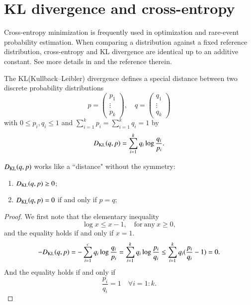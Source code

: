 \section{KL divergence and cross-entropy}
Cross-entropy minimization is frequently used in optimization and rare-event probability estimation. When comparing a distribution    against a fixed reference distribution, cross-entropy and KL divergence are identical up to an additive constant. See more details in \cite{murphy2012machine,kullback1951information,kullback1997information} and the reference therein.

The KL(Kullback--Leibler) divergence defines a special distance between two discrete probability distributions 
$$
p=\left( \begin{array}{ccc}
p_1\\
\vdots \\
p_k
\end{array} \right),\quad  q=\left( \begin{array}{ccc}
q_1\\
\vdots \\
q_k
\end{array} \right)
$$
with $0\le p_i, q_i\le1$ and $\sum_{i=1}^{k}p_i=\sum_{i=1}^{k}q_i=1$ by
\begin{equation}
\label{KL-divergence}
D_{\rm KL}(q,p)= \sum_{i=1}^k q_i\log \frac{q_i}{p_i}.  
\end{equation}

\begin{lemma}\mbox{}
$D_{\rm KL}(q,p)$ works like a ``distance" without the symmetry:
	\begin{enumerate}
		\item $D_{\rm KL}(q,p)\ge0$;		
		\item $D_{\rm KL}(q,p)=0$ if and only if $p=q$;
	\end{enumerate}
\end{lemma}

\begin{proof}We first note that the elementary inequality
	\begin{equation}
	\log x \le x - 1, \quad\mathrm{for\ any\ }x\ge0,
	\end{equation}
	and the equality holds if and only if $x=1$.
	\begin{equation}
	-D_{\rm KL}(q,p) = - \sum_{i=1}^c q_i\log \frac{q_i}{p_i}   = \sum_{i=1}^k q_i\log \frac{p_i}{q_i} \le \sum_{i=1}^k q_i( \frac{p_i}{q_i}  - 1) = 0.
	\end{equation}
	And the equality holds if and only if 
	\begin{equation}
	\frac{p_i}{q_i} = 1 \quad \forall i = 1:k.
	\end{equation}
\end{proof}


